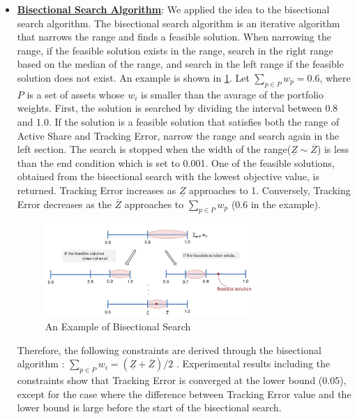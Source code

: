 \documentclass[11pt]{article}
\begin{document}
\begin{itemize}
	\item[] \underline{\textbf{Bisectional Search Algorithm}}:
	 We applied the idea to the bisectional search algorithm. The bisectional search algorithm is an iterative algorithm that narrows the range and finds a feasible solution. When narrowing the range, if the feasible solution exists in the range, search in the right range based on the median of the range, and search in the left range if the feasible solution does not exist.	
	An example is shown in \ref{fig:bisection}. Let  $ \sum_{p\in P} w_p = 0.6$, where $P$ is a set of assets whose $w_i$ is smaller than the avarage of the portfolio weights. First, the solution is searched by dividing the interval between 0.8 and 1.0. If the solution is a feasible solution that satisfies both the range of Active Share and Tracking Error, narrow the range and search again in the left section. The search is stopped when the width of the range($\underline{Z} \sim \overline{Z}$) is less than the end condition which is set to 0.001. One of the feasible solutions, obtained from the bisectional search with the lowest objective value, is returned. Tracking Error increases as $\underline{Z}$ approaches to 1. Conversely, Tracking Error decreases as the $\overline{Z}$ approaches to $\sum_{p\in P}w_p$ (0.6 in the example). 
	\begin{figure}[h] 
		\begin{center}
			\includegraphics[width=0.75\textwidth]{bisection}
			\caption{An Example of Bisectional Search} \label{fig:bisection}
		\end{center}
	\end{figure}
	Therefore, the following constraints are derived through the bisectional algorithm : $\sum_{p \in P} w_i = (\underline{Z} +\overline{Z})/2 $ . Experimental results including the constraints show that Tracking Error is converged at the lower bound (0.05), except for the case where the difference between Tracking Error value and the lower bound is large before the start of the bisectional search.
	
	

\end{itemize}
\end{document}
